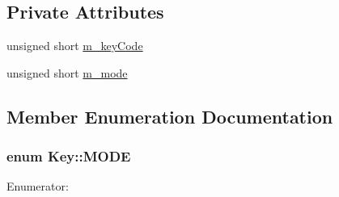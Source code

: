 \subsection*{Private Attributes}
\begin{DoxyCompactItemize}
\item 
unsigned short \hyperlink{class_key_ae6d7c00f3366108e2f45886797e0566d}{m\-\_\-key\-Code}
\item 
unsigned short \hyperlink{class_key_a6e6fc320c7ab65b829317223f357d706}{m\-\_\-mode}
\end{DoxyCompactItemize}


\subsection{Member Enumeration Documentation}
\hypertarget{class_key_a6f8c4beba5584878553ee5b3077be416}{
\subsubsection[{M\-O\-D\-E}]{\setlength{\rightskip}{0pt plus 5cm}enum {\bf Key\-::\-M\-O\-D\-E}}}\label{class_key_a6f8c4beba5584878553ee5b3077be416}
\begin{Desc}
\item[Enumerator\-: ]\par
\begin{description}
\item[{\em 
\hypertarget{class_key_a6f8c4beba5584878553ee5b3077be416a921a98871b9bca60fb5abbfb2cbaa4dd}{C\-L\-I\-C\-K}\label{class_key_a6f8c4beba5584878553ee5b3077be416a921a98871b9bca60fb5abbfb2cbaa4dd}
}]\item[{\em 
\hypertarget{class_key_a6f8c4beba5584878553ee5b3077be416ab0381f960318045ea8221f73863fd499}{D\-O\-W\-N}\label{class_key_a6f8c4beba5584878553ee5b3077be416ab0381f960318045ea8221f73863fd499}
}]\item[{\em 
\hypertarget{class_key_a6f8c4beba5584878553ee5b3077be416a94528a9df1ce9f0789fb5e33780424f1}{U\-P}\label{class_key_a6f8c4beba5584878553ee5b3077be416a94528a9df1ce9f0789fb5e33780424f1}
}]\end{description}
\end{Desc}



